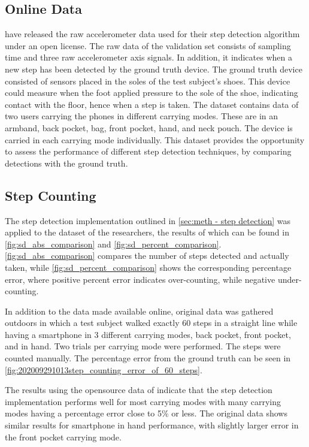 \subsection{Online Data}
\citet{Salvi2018} have released the raw accelerometer data used for their step detection algorithm under an open license. The raw data of the validation set consists of sampling time and three raw accelerometer axis signals. In addition, it indicates when a new step has been detected by the ground truth device. The ground truth device consisted of sensors placed in the soles of the test subject's shoes. This device could measure when the foot applied pressure to the sole of the shoe, indicating contact with the floor, hence when a step is taken. The dataset contains data of two users carrying the phones in different carrying modes. These are in an armband, back pocket, bag, front pocket, hand, and neck pouch. The device is carried in each carrying mode individually.  This dataset provides the opportunity to assess the performance of different step detection techniques, by comparing detections with the ground truth.\par

\subsection{Step Counting}

The step detection implementation outlined in \cref{sec:meth - step detection} was applied to the dataset of the researchers, the results of which can be found in  \cref{fig:sd_abs_comparison} and \cref{fig:sd_percent_comparison}. \cref{fig:sd_abs_comparison} compares the number of steps detected and actually taken, while \cref{fig:sd_percent_comparison}  shows the corresponding percentage error, where positive percent error indicates over-counting, while negative under-counting. \par 

In addition to the data made available online, original data was gathered outdoors in which a test subject walked exactly 60 steps in a straight line while having a smartphone in 3 different carrying modes, back pocket, front pocket, and in hand. Two trials per carrying mode were performed. The steps were counted manually. The percentage error from the ground truth can be seen in \cref{fig:202009291013step_counting_error_of_60_steps}.

The results using the opensource data of \citet{Salvi2018} indicate that the step detection implementation performs well for most carrying modes with many carrying modes having a percentage error close to 5\% or less. The original data shows similar results for smartphone in hand performance, with slightly larger error in the front pocket carrying mode.\par 

